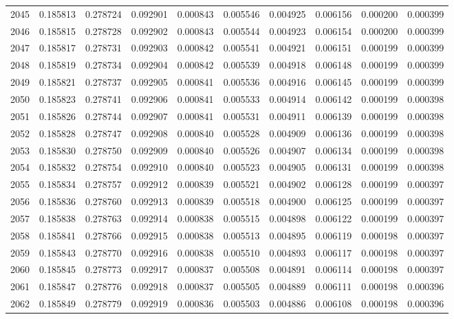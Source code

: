 \begin{tabular}{lrrrrrrrrr}
2045 & 0.185813 & 0.278724 & 0.092901 & 0.000843 & 0.005546 & 0.004925 & 0.006156 & 0.000200 & 0.000399 \\
2046 & 0.185815 & 0.278728 & 0.092902 & 0.000843 & 0.005544 & 0.004923 & 0.006154 & 0.000200 & 0.000399 \\
2047 & 0.185817 & 0.278731 & 0.092903 & 0.000842 & 0.005541 & 0.004921 & 0.006151 & 0.000199 & 0.000399 \\
2048 & 0.185819 & 0.278734 & 0.092904 & 0.000842 & 0.005539 & 0.004918 & 0.006148 & 0.000199 & 0.000399 \\
2049 & 0.185821 & 0.278737 & 0.092905 & 0.000841 & 0.005536 & 0.004916 & 0.006145 & 0.000199 & 0.000399 \\
2050 & 0.185823 & 0.278741 & 0.092906 & 0.000841 & 0.005533 & 0.004914 & 0.006142 & 0.000199 & 0.000398 \\
2051 & 0.185826 & 0.278744 & 0.092907 & 0.000841 & 0.005531 & 0.004911 & 0.006139 & 0.000199 & 0.000398 \\
2052 & 0.185828 & 0.278747 & 0.092908 & 0.000840 & 0.005528 & 0.004909 & 0.006136 & 0.000199 & 0.000398 \\
2053 & 0.185830 & 0.278750 & 0.092909 & 0.000840 & 0.005526 & 0.004907 & 0.006134 & 0.000199 & 0.000398 \\
2054 & 0.185832 & 0.278754 & 0.092910 & 0.000840 & 0.005523 & 0.004905 & 0.006131 & 0.000199 & 0.000398 \\
2055 & 0.185834 & 0.278757 & 0.092912 & 0.000839 & 0.005521 & 0.004902 & 0.006128 & 0.000199 & 0.000397 \\
2056 & 0.185836 & 0.278760 & 0.092913 & 0.000839 & 0.005518 & 0.004900 & 0.006125 & 0.000199 & 0.000397 \\
2057 & 0.185838 & 0.278763 & 0.092914 & 0.000838 & 0.005515 & 0.004898 & 0.006122 & 0.000199 & 0.000397 \\
2058 & 0.185841 & 0.278766 & 0.092915 & 0.000838 & 0.005513 & 0.004895 & 0.006119 & 0.000198 & 0.000397 \\
2059 & 0.185843 & 0.278770 & 0.092916 & 0.000838 & 0.005510 & 0.004893 & 0.006117 & 0.000198 & 0.000397 \\
2060 & 0.185845 & 0.278773 & 0.092917 & 0.000837 & 0.005508 & 0.004891 & 0.006114 & 0.000198 & 0.000397 \\
2061 & 0.185847 & 0.278776 & 0.092918 & 0.000837 & 0.005505 & 0.004889 & 0.006111 & 0.000198 & 0.000396 \\
2062 & 0.185849 & 0.278779 & 0.092919 & 0.000836 & 0.005503 & 0.004886 & 0.006108 & 0.000198 & 0.000396 \\

\end{tabular}
